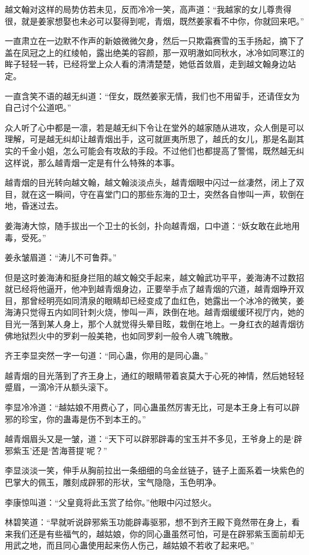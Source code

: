 越文翰对这样的局势仿若未见，反而冷冷一笑，高声道：“我越家的女儿尊贵得很，就是姜家想娶也未必可以娶得到呢，青烟，既然姜家看不中你，你就回来吧。”

一直肃立在一边默不作声的新娘微微欠身，然后一只欺霜赛雪的玉手扬起，摘下了盖在凤冠之上的红绫帕，露出绝美的容颜，那一双明澈如同秋水，冰冷如同寒江的眸子轻轻一转，已经将堂上众人看的清清楚楚，她低首敛眉，走到越文翰身边站定。

一直含笑不语的越无纠道：“侄女，既然姜家无情，我们也不用留手，还请侄女为自己讨个公道吧。”

众人听了心中都是一凛，若是越无纠下令让在堂外的越家随从进攻，众人倒是可以理解，可是越无纠却让越青烟出手，这可就匪夷所思了，越氏的女儿，那是名副其实的千金小姐，怎么可能会有攻敌的手段。不过他们也都提高了警惕，既然越无纠这样说，那么越青烟一定是有什么特殊的本事。

越青烟的目光转向越文翰，越文翰淡淡点头，越青烟眼中闪过一丝凄然，闭上了双目，就在这一瞬间，守在喜堂门口的那些东海的卫士，突然各自惨叫一声，软倒在地，昏迷过去。

姜海涛大惊，随手拔出一个卫士的长剑，扑向越青烟，口中道：“妖女敢在此地用毒，受死。”

姜永皱眉道：“涛儿不可鲁莽。”

但是这时姜海涛和挺身拦阻的越文翰交手起来，越文翰武功平平，姜海涛不过数招就已经将他逼开，他冲到越青烟身边，正要举手点了越青烟的穴道，越青烟睁开双目，那曾经明亮如同清泉的眼睛却已经变成了血红色，她露出一个冰冷的微笑，姜海涛只觉得五内如同针刺火烧，惨叫一声，跌倒在地。越青烟缓缓环视厅内，她的目光一落到某人身上，那个人就觉得头晕目眩，栽倒在地上。一身红衣的越青烟彷佛地狱烈火中的罗刹一般美艳，也如同罗刹一般令人魂飞魄散。

齐王李显突然一字一句道：“同心蛊，你用的是同心蛊。”

越青烟的目光落到了齐王身上，通红的眼睛带着哀莫大于心死的神情，然后她轻轻蹙眉，一滴冷汗从额头滚下。

李显冷冷道：“越姑娘不用费心了，同心蛊虽然厉害无比，可是本王身上有可以辟邪的珍宝，你的蛊毒是伤不到本王的。”

越青烟眉头又是一皱，道：“天下可以辟邪辟毒的宝玉并不多见，王爷身上的是‘辟邪紫玉’还是‘苦海菩提’呢？”

李显淡淡一笑，伸手从胸前拉出一条细细的乌金丝链子，链子上面系着一块紫色的巴掌大的佩玉，雕刻成辟邪的形状，宝气隐隐，玉色明净。

李康惊叫道：“父皇竟将此玉赏了给你。”他眼中闪过怒火。

林碧笑道：“早就听说辟邪紫玉功能辟毒驱邪，想不到齐王殿下竟然带在身上，看来我们还是有些福气的，越姑娘，你的同心蛊虽然可怕，可是在辟邪紫玉面前却无用武之地，而且同心蛊使用起来伤人伤己，越姑娘不若收了起来吧。”

